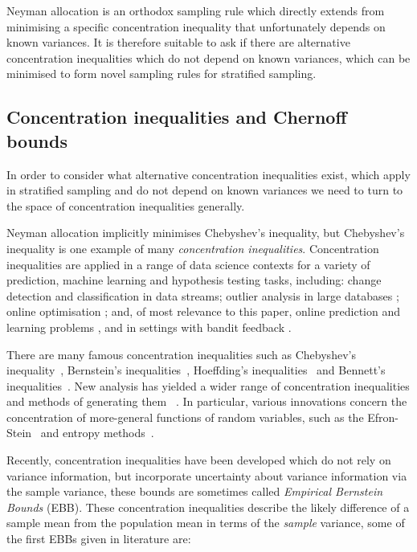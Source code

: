 Neyman allocation is an orthodox sampling rule which directly extends from minimising a specific concentration inequality that unfortunately depends on known variances.
It is therefore suitable to ask if there are alternative concentration inequalities which do not depend on known variances, which can be minimised to form novel sampling rules for stratified sampling.




\subsection{Concentration inequalities and Chernoff bounds}

In order to consider what alternative concentration inequalities exist, which apply in stratified sampling and do not depend on known variances we need to turn to the space of concentration inequalities generally. 

Neyman allocation implicitly minimises Chebyshev's inequality, but Chebyshev's inequality is one example of many \textit{concentration inequalities}.
Concentration inequalities are applied in a range of data science contexts for a variety of prediction, machine learning and hypothesis testing tasks, including:
change detection \cite{KiferShaiGehrke2004,8000571} 
and classification \cite{Zia-UrRehman2012} in data streams;
outlier analysis in large databases \cite{Aggarwal2015};
online optimisation \cite{FlaxmanKalaiMcMahan2005,AgarwalDekelXiao2010}; and, of most relevance to this paper, 
online prediction and learning problems \cite{%
Mnih:2008:EBS:1390156.1390241,DBLP:conf/aaai/ThomasTG15,Maurer50empiricalbernstein},
and in settings with bandit feedback \cite{AuerCesa-BianchiEtal_SIAM2003,AudibertBubeck_COLT2009,Tran-ThanhChapmanRJ_AAAI2009}.

There are many famous concentration inequalities such as Chebyshev's inequality~\cite{Chebyshev1}, Bernstein's inequalities~\cite{Burnstein1}, 
Hoeffding's inequalities~\cite{hoeffding1} and Bennett's inequalities~\cite{10.2307/2282438}.
New analysis has yielded a wider range of concentration inequalities and methods of generating them ~\cite{MR3363542,Boucheron2004}. 
In particular, various innovations concern the concentration of more-general functions of random variables, such as 
the Efron-Stein~\cite{efron1981} and 
entropy methods~\cite{Boucheron_concentrationinequalities}.%

Recently, concentration inequalities have been developed which do not rely on variance information, but incorporate uncertainty about variance information via the sample variance, these bounds are sometimes called \textit{Empirical Bernstein Bounds} (EBB).
These concentration inequalities describe the likely difference of a sample mean from the population mean in terms of the \textit{sample} variance, some of the first EBBs given in literature are:

